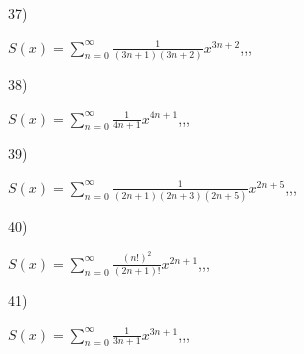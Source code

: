 \documentclass[11pt, ukrainian]{article}
\begin{document}
\par
\vspace{0.9cm}
37) \space 
{%
{$S(x)=\sum\limits_{n=0}^{\infty}{\frac{1}{(3n+1)(3n+2)}}{x^{{3n+2}}}$},,, \par \smallskip  
}
\par
\vspace{0.9cm}
38) \space 
{%
{$S(x)=\sum\limits_{n=0}^{\infty}{\frac{1}{4n+1}}{x^{{4n+1}}}$},,, \par \smallskip  
}
\par
\vspace{0.9cm}
39) \space 
{%
{$S(x)=\sum\limits_{n=0}^{\infty}{\frac{1}{(2n+1)(2n+3)(2n+5)}}{x^{{2n+5}}}$},,, \par \smallskip  
}
\par
\vspace{0.9cm}
40) \space 
{%
{$S(x)=\sum\limits_{n=0}^{\infty}{\frac{(n!)^2}{(2n+1)!}}{x^{{2n+1}}}$},,, \par \smallskip  
}
\par
\newpage
41) \space 
{%
{$S(x)=\sum\limits_{n=0}^{\infty}{\frac{1}{3n+1}}{x^{{3n+1}}}$},,, \par \smallskip  
}
\par
\vspace{0.9cm}
\end{document}
